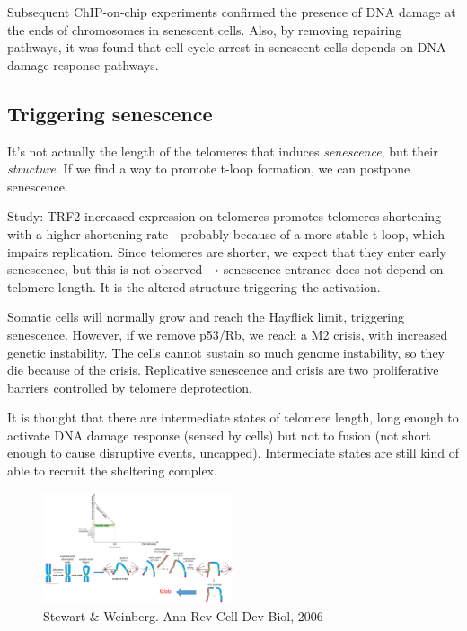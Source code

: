 Subsequent ChIP-on-chip experiments confirmed the presence of DNA damage
at the ends of chromosomes in senescent cells. Also, by removing
repairing pathways, it was found that cell cycle arrest in senescent
cells depends on DNA damage response pathways.

\hypertarget{triggering-senescence}{%
\subsection{Triggering senescence}\label{triggering-senescence}}

It's not actually the length of the telomeres that induces
\emph{senescence}, but their \emph{structure}. If we find a way to
promote t-loop formation, we can postpone senescence.

Study: TRF2 increased expression on telomeres promotes telomeres
shortening with a higher shortening rate - probably because of a more
stable t-loop, which impairs replication. Since telomeres are shorter,
we expect that they enter early senescence, but this is not observed →
senescence entrance does not depend on telomere length. It is the
altered structure triggering the activation.

Somatic cells will normally grow and reach the Hayflick limit,
triggering senescence. However, if we remove p53/Rb, we reach a M2
crisis, with increased genetic instability. The cells cannot sustain so
much genome instability, so they die because of the crisis. Replicative
senescence and crisis are two proliferative barriers controlled by
telomere deprotection.

It is thought that there are intermediate states of telomere length,
long enough to activate DNA damage response (sensed by cells) but not to
fusion (not short enough to cause disruptive events, uncapped).
Intermediate states are still kind of able to recruit the sheltering
complex.

\begin{figure}
\centering
\includegraphics[width=0.5\textwidth]{../_resources/Screen_Shot_2022-12-15_at_22-39-00.png}
\caption{Stewart \& Weinberg. Ann Rev Cell Dev Biol, 2006}
\label{fig:crisis}
\end{figure}

